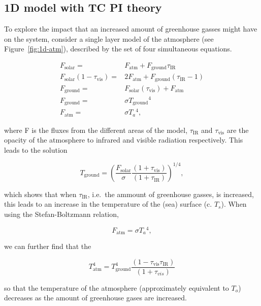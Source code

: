 \subsection{1D model with TC PI theory}
\label{sec:1d-hurr}
To explore the impact that an increased amount of greenhouse gasses might have
on the system, consider a single layer model of the atmosphere (see Figure~\ref{fig:1d-atm}), described by the
set of four simultaneous equations.



\begin{eqnarray}
F_{\mathrm{solar}} =& F_{\mathrm{atm}} + F_{\mathrm{ground}}\tau_{\mathrm{IR}}\\
F_{\mathrm{solar}}(1-\tau_{\mathrm{vis}}) =& 2F_{\mathrm{atm}} + F_{\mathrm{ground}}(\tau_{\mathrm{IR}}-1)\\
F_{\mathrm{ground}} = & F_{\mathrm{solar}}(\tau_{\mathrm{vis}}) +F_{\mathrm{atm}}  \\
F_{\mathrm{ground}} = & \sigma T_{\mathrm{ground}}{}^4 \\
F_{\mathrm{atm}} = & \sigma T_a{}^{4},
\end{eqnarray}

where F is the fluxes from the different areas of the model,
$ \tau_{\mathrm{IR}}$ and $\tau_{\mathrm{vis}}$ are the opacity of the atmosphere
to infrared and visible radiation respectively.
This leads to the solution

\begin{equation}
T_{\mathrm{ground}} = \left( \frac{F_{\mathrm{solar}}}{\sigma}\frac{(1+\tau_{\mathrm{vis}})}{(1+\tau_{\mathrm{IR}})}\right)^{1/4},
\end{equation}

which shows that when $\tau_{\mathrm{IR}}$, i.e.~the ammount of greenhouse gasses,
is increased, this leads to an increase in the temperature of the (sea) surface (c. $T_s$).
When using the Stefan-Boltzmann relation,

\begin{equation}
F_{\mathrm{atm}} = \sigma T_a{}^{4},
\end{equation}

we can further find that the

\begin{equation}
T_{\mathrm{atm}}^{4}=T_{\mathrm{ground}}^4\frac{(1-\tau_{\mathrm{vis}}\tau_{\mathrm{IR}})}{(1+\tau_{vis})}
\end{equation}

so that the temperature of the atmosphere (approximately equivalent to $T_{o}$)
decreases as the amount of greenhouse gases are increased.


